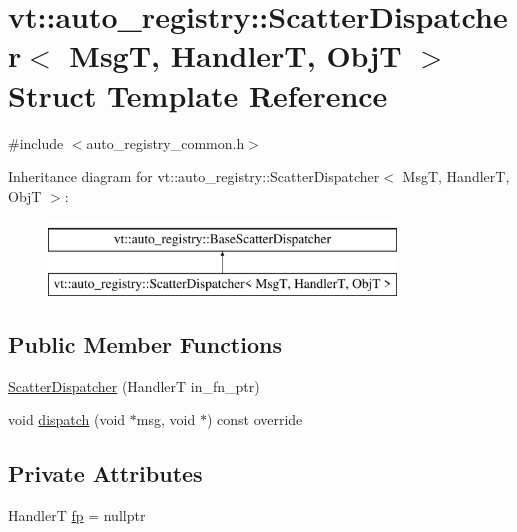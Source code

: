 \hypertarget{structvt_1_1auto__registry_1_1_scatter_dispatcher}{}\section{vt\+:\+:auto\+\_\+registry\+:\+:Scatter\+Dispatcher$<$ MsgT, HandlerT, ObjT $>$ Struct Template Reference}
\label{structvt_1_1auto__registry_1_1_scatter_dispatcher}


{\ttfamily \#include $<$auto\+\_\+registry\+\_\+common.\+h$>$}

Inheritance diagram for vt\+:\+:auto\+\_\+registry\+:\+:Scatter\+Dispatcher$<$ MsgT, HandlerT, ObjT $>$\+:\begin{figure}[H]
\begin{center}
\leavevmode
\includegraphics[height=2.000000cm]{structvt_1_1auto__registry_1_1_scatter_dispatcher}
\end{center}
\end{figure}
\subsection*{Public Member Functions}
\begin{DoxyCompactItemize}
\item 
\hyperlink{structvt_1_1auto__registry_1_1_scatter_dispatcher_a1059ed7e28fe51d138a6945593dce385}{Scatter\+Dispatcher} (HandlerT in\+\_\+fn\+\_\+ptr)
\item 
void \hyperlink{structvt_1_1auto__registry_1_1_scatter_dispatcher_a37e6677295c03cc4f20794286984cb5e}{dispatch} (void $\ast$msg, void $\ast$) const override
\end{DoxyCompactItemize}
\subsection*{Private Attributes}
\begin{DoxyCompactItemize}
\item 
HandlerT \hyperlink{structvt_1_1auto__registry_1_1_scatter_dispatcher_ab46d5400a04ca6282b2db43de7d0ca31}{fp} = nullptr
\end{DoxyCompactItemize}


